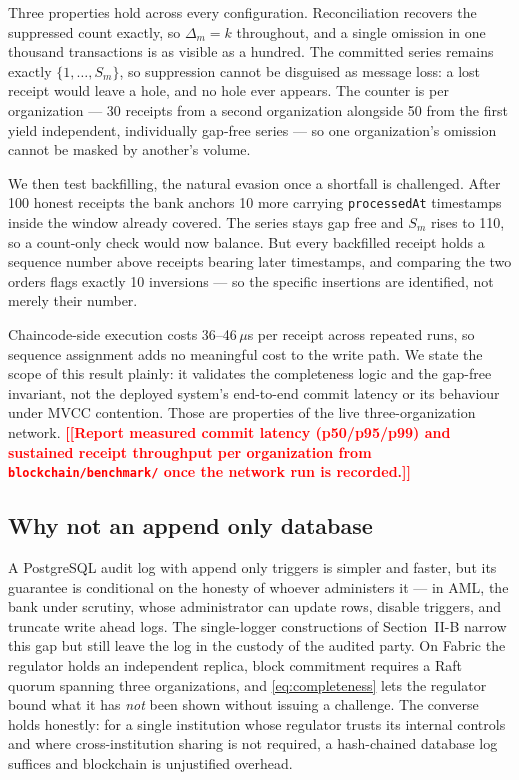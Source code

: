 \documentclass[conference]{IEEEtran}
\newcommand{\TODO}[1]{\textcolor{red}{\textbf{[[#1]]}}}
\begin{document}
Three properties hold across every configuration. Reconciliation recovers the
suppressed count exactly, so $\Delta_m = k$ throughout, and a single omission in
one thousand transactions is as visible as a hundred. The committed series
remains exactly $\{1,\dots,S_m\}$, so suppression cannot be disguised as message
loss: a lost receipt would leave a hole, and no hole ever appears. The counter
is per organization --- 30 receipts from a second organization alongside 50 from
the first yield independent, individually gap-free series --- so one
organization's omission cannot be masked by another's volume.

We then test backfilling, the natural evasion once a shortfall is challenged.
After 100 honest receipts the bank anchors 10 more carrying \texttt{processedAt}
timestamps inside the window already covered. The series stays gap free and
$S_m$ rises to 110, so a count-only check would now balance. But every
backfilled receipt holds a sequence number above receipts bearing later
timestamps, and comparing the two orders flags exactly 10 inversions --- so the
specific insertions are identified, not merely their number.

Chaincode-side execution costs 36--46\,$\mu$s per receipt across repeated
runs, so sequence
assignment adds no meaningful cost to the write path. We state the scope of this
result plainly: it validates the completeness logic and the gap-free invariant,
not the deployed system's end-to-end commit latency or its behaviour under MVCC
contention. Those are properties of the live three-organization network.
\TODO{Report measured commit latency (p50/p95/p99) and sustained receipt
throughput per organization from \texttt{blockchain/benchmark/} once the network
run is recorded.}

\subsection{Why not an append only database}

A PostgreSQL audit log with append only triggers is simpler and faster, but its
guarantee is conditional on the honesty of whoever administers it --- in AML,
the bank under scrutiny, whose administrator can update rows, disable triggers,
and truncate write ahead logs. The single-logger constructions of Section~II-B
narrow this gap but still leave the log in the custody of the audited party. On
Fabric the regulator holds an independent replica, block commitment requires a
Raft quorum spanning three organizations, and \eqref{eq:completeness} lets the
regulator bound what it has \emph{not} been shown without issuing a challenge.
The converse holds honestly: for a single institution whose regulator trusts its
internal controls and where cross-institution sharing is not required, a
hash-chained database log suffices and blockchain is unjustified overhead.
\end{document}
